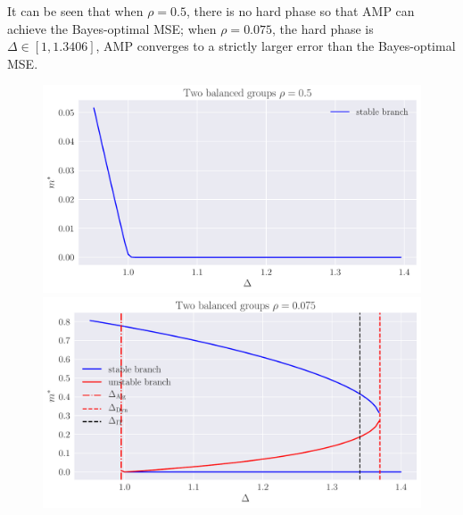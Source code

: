 \documentclass[a4paper,oneside,12pt]{article}
\begin{document}
\begin{solution}
\begin{enumerate}[(a)]
        It can be seen that when $ \rho = 0.5 $, there is no hard phase so that AMP can achieve the Bayes-optimal MSE; when $ \rho = 0.075 $, the hard phase is $ \Delta \in [1, 1.3406] $, AMP converges to a strictly larger error than the Bayes-optimal MSE.
        \begin{figure}[H]
            \centering
            \includegraphics[width=400pt]{hw4/hw4_5_2.pdf}
            \includegraphics[width=400pt]{hw4/hw4_5_1.pdf}
        \end{figure}

\end{enumerate}
\end{solution}
        
\end{document}
